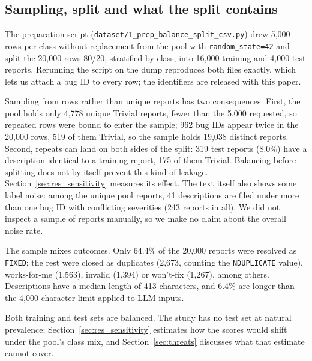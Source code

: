 \documentclass[a4paper,fleqn]{cas-sc}
\begin{document}
\begin{table}[width=\linewidth,cols=6,pos=t]
\caption{Labels in the Hugging Face dump and how the experimental sample was drawn.
``Rows'' counts every row in the file; ``Unique reports'' drops the 60,000 repeated
rows. The pool is what the sampler drew from; it still contains repeated rows.}
\label{tab:dataset}
\small

\end{table}

\subsection{Sampling, split and what the split contains}

The preparation script (\texttt{dataset/1\_prep\_balance\_split\_csv.py}) drew 5,000
rows per class without replacement from the pool with \texttt{random\_state=42} and
split the 20,000 rows 80/20, stratified by class, into 16,000 training and 4,000 test
reports. Rerunning the script on the dump reproduces both files exactly, which lets us
attach a bug ID to every row; the identifiers are released with this paper.

Sampling from rows rather than unique reports has two consequences. First, the pool
holds only 4,778 unique Trivial reports, fewer than the 5,000 requested, so repeated
rows were bound to enter the sample; 962 bug IDs appear twice in the 20,000 rows, 519
of them Trivial, so the sample holds 19,038 distinct reports. Second, repeats can land on both sides of the split: 319
test reports (8.0\%) have a description identical to a training report, 175 of them
Trivial. Balancing before splitting does not by itself prevent this kind of leakage.
Section~\ref{sec:res_sensitivity} measures its effect. The text itself also shows some
label noise: among the unique pool reports, 41 descriptions are filed under more than
one bug ID with conflicting severities (243 reports in all). We did not inspect a
sample of reports manually, so we make no claim about the overall noise rate.

The sample mixes outcomes. Only 64.4\% of the 20,000 reports were resolved as
\texttt{FIXED}; the rest were closed as duplicates (2,673, counting the
\texttt{NDUPLICATE} value), works-for-me (1,563), invalid (1,394) or won't-fix (1,267),
among others. Descriptions have a median length of 413 characters, and 6.4\% are longer
than the 4,000-character limit applied to LLM inputs.

Both training and test sets are balanced. The study has no test set at natural
prevalence; Section~\ref{sec:res_sensitivity} estimates how the scores would shift
under the pool's class mix, and Section~\ref{sec:threats} discusses what that estimate
cannot cover.
\end{document}
